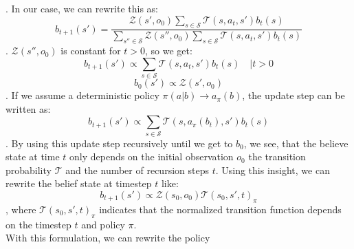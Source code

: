 . In our case, we can rewrite this as:
\begin{equation}
    b_{t+1}(s') = \frac{\mathcal{Z}(s', o_{0}) \sum_{s \in \mathcal{S}} \mathcal{T}(s, a_t, s') b_t(s)}{\sum_{s'' \in \mathcal{S}} \mathcal{Z}(s'', o_{0}) \sum_{s \in \mathcal{S}} \mathcal{T}(s, a_t, s') b_t(s)}
\end{equation}
. $\mathcal{Z}(s'', o_{0})$ is constant for $t>0$, so we get:
\begin{equation}
    b_{t+1}(s') \propto \sum_{s \in \mathcal{S}} \mathcal{T}(s, a_t, s') b_t(s) \quad | t > 0
\end{equation}
\begin{equation*}
    b_{0}(s') \propto \mathcal{Z}(s', o_{0})
\end{equation*}
. If we assume a deterministic policy $\pi(a|b) \rightarrow a_{\pi}(b)$, the update step can be written as:
\begin{equation}
    b_{t+1}(s') \propto \sum_{s \in \mathcal{S}} \mathcal{T}(s, a_{\pi}(b_t), s') b_t(s)
\end{equation}
. By using this update step recursively until we get to $b_{0}$, we see, that the believe state at time $t$ only depends on the initial observation $o_0$
the transition probability $\mathcal{T}$ and the number of recursion steps $t$. Using this insight, we can rewrite the belief state at timestep $t$ like:
\begin{equation}
    b_{t+1}(s') \propto \mathcal{Z}(s_0, o_{0}) \mathcal{T}(s_0, s', t)_{\pi}
\end{equation}
, where $\mathcal{T}(s_0, s', t)_{\pi}$ indicates that the normalized transition function depends on the timestep $t$ and policy $\pi$.\\
With this formulation, we can rewrite the policy 

